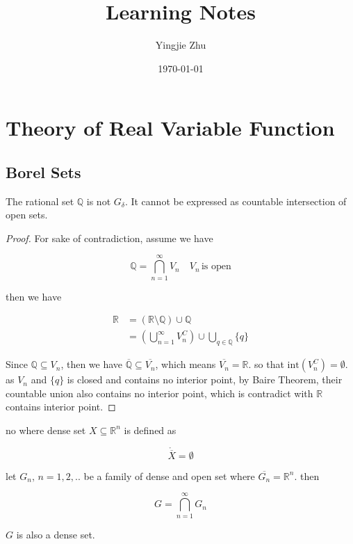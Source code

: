 \documentclass[11pt,a4paper]{article}
\title{Learning Notes}
\author{Yingjie Zhu}
\date{\today}
\begin{document}
\maketitle

\section{Theory of Real Variable Function}

\subsection{Borel Sets}

\begin{prop}
    The rational set $\mathbb{Q}$ is not $G_{\delta}$. It cannot be expressed as countable intersection of open sets.
\end{prop}

\begin{proof}
    For sake of contradiction, assume we have

    \[
        \mathbb{Q} = \bigcap_{n=1}^{\infty}V_n\quad V_n \, \text{is open}
    \]

    then we have

    \begin{align*}
        \mathbb{R} &= \left( \mathbb{R} \setminus \mathbb{Q} \right) \cup \mathbb{Q} \\
        &= \left( \bigcup_{n=1}^{\infty}V_n^C \right) \cup \bigcup_{q \in \mathbb{Q}} \{ q \}
    \end{align*}

    Since $\mathbb{Q} \subseteq V_n$, then we have $\overline{\mathbb{Q}} \subseteq \overline{V_n} $, which means $\overline{V_n} = \mathbb{R}$.
    so that $\text{int}\left({V_n^C} \right) = \emptyset$. as $V_n$ and $\{ q \}$ is closed and contains no interior point, 
    by Baire Theorem, their countable union also contains no interior point, which is contradict with $\mathbb{R}$ contains interior point.
\end{proof}

\begin{definition}
    no where dense set $X \subseteq \mathbb{R}^n$ is defined as 

    \[
        \mathring{\overline{X}} = \emptyset
    \]
\end{definition}

\begin{prop}
    let $G_n,\, n=1,2,..$ be a family of dense and open set where $\overline{G_n} = \mathbb{R}^n$. then 

    \[
        G= \bigcap_{n=1}^{\infty}G_n
    \]

    $G$ is also a dense set.
\end{prop}
\end{document}
